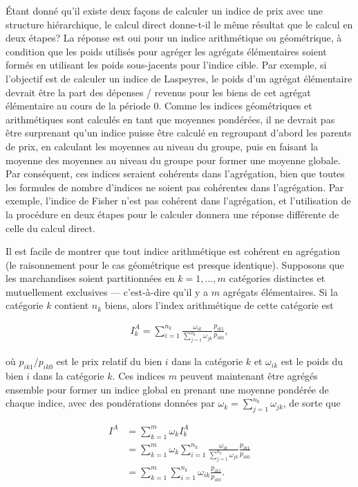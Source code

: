 \documentclass[
]{article}
\begin{document}
Étant donné qu'il existe deux façons de calculer un indice de prix avec une structure hiérarchique, le calcul direct donne-t-il le même résultat que le calcul en deux étapes? La réponse est oui pour un indice arithmétique ou géométrique, à condition que les poids utilisés pour agréger les agrégats élémentaires soient formés en utilisant les poids sous-jacents pour l'indice cible. Par exemple, si l'objectif est de calculer un indice de Laspeyres, le poids d'un agrégat élémentaire devrait être la part des dépenses / revenus pour les biens de cet agrégat élémentaire au cours de la période 0. Comme les indices géométriques et arithmétiques sont calculés en tant que moyennes pondérées, il ne devrait pas être surprenant qu'un indice puisse être calculé en regroupant d'abord les parents de prix, en calculant les moyennes au niveau du groupe, puis en faisant la moyenne des moyennes au niveau du groupe pour former une moyenne globale. Par conséquent, ces indices seraient cohérents dans l'agrégation, bien que toutes les formules de nombre d'indices ne soient pas cohérentes dans l'agrégation. Par exemple, l'indice de Fisher n'est pas cohérent dans l'agrégation, et l'utilisation de la procédure en deux étapes pour le calculer donnera une réponse différente de celle du calcul direct.

Il est facile de montrer que tout indice arithmétique est cohérent en agrégation (le raisonnement pour le cas géométrique est presque identique). Supposons que les marchandises soient partitionnées en \(k = 1, \ldots, m\) catégories distinctes et mutuellement exclusives --- c'est-à-dire qu'il y a \(m\) agrégats élémentaires. Si la catégorie \(k\) contient \(n_{k}\) biens, alors l'index arithmétique de cette catégorie est

\begin{align*}
I_{k}^{A} = \sum_{i = 1}^{n_k} \frac{\omega_{ik}}{\sum_{j = 1}^{n_k} \omega_{jk}} \frac{p_{ik1}}{p_{ik0}},
\end{align*}

où \(p_{ik1} / p_{ik0}\) est le prix relatif du bien \(i\) dans la catégorie \(k\) et \(\omega_{ik}\) est le poids du bien \(i\) dans la catégorie \(k\). Ces indices \(m\) peuvent maintenant être agrégés ensemble pour former un indice global en prenant une moyenne pondérée de chaque indice, avec des pondérations données par \(\omega_{k} = \sum_{j = 1}^{n_k} \omega_{jk}\), de sorte que

\begin{align*}
I^{A} &= \sum_{k = 1}^{m} \omega_k I_{k}^{A} \\
&= \sum_{k = 1}^{m} \omega_k \sum_{i = 1}^{n_k} \frac{\omega_{ik}}{\sum_{j = 1}^{n_k} \omega_{jk}} \frac{p_{ik1}}{p_{ik0}} \\
&= \sum_{k = 1}^{m} \sum_{i = 1}^{n_k} \omega_{ik} \frac{p_{ik1}}{p_{ik0}}.
\end{align*}
\end{document}
